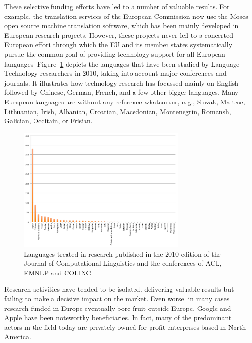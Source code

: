 \documentclass[10pt, plain]{../../metanetpaper}
\begin{document}
\begin{multicols}{2}
These selective funding efforts have led to a number of valuable results. For example, the translation services of the European Commission now use the Moses open source machine translation software, which has been mainly developed in European research projects. However, these projects never led to a concerted European effort through which the EU and its member states systematically pursue the common goal of providing technology support for all European languages. Figure~\ref{fig:languages-in-research} depicts the languages that have been studied by Language Technology researchers in 2010, taking into account major conferences and journals. It illustrates how technology research has focussed mainly on English followed by Chinese, German, French, and a few other bigger languages. Many European languages are without any reference whatsoever, e.\,g., Slovak, Maltese, Lithuanian, Irish, Albanian, Croatian, Macedonian, Montenegrin, Romansh, Galician, Occitain, or Frisian.

\begin{figure}[htb]
  \center
  \includegraphics[width=0.75\textwidth]{../_media/Languages-in-LT-Research}
  \caption{Languages treated in research published in the 2010 edition of the Journal of Computational Linguistics and the conferences of ACL, EMNLP and COLING}
  \label{fig:languages-in-research}
\end{figure}

Research activities have tended to be isolated, delivering valuable results but failing to make a decisive impact on the market. Even worse, in many cases research funded in Europe eventually bore fruit outside Europe. Google and Apple have been noteworthy beneficiaries. In fact, many of the predominant actors in the field today are privately-owned for-profit enterprises based in North America.


\end{multicols}
\end{document}
